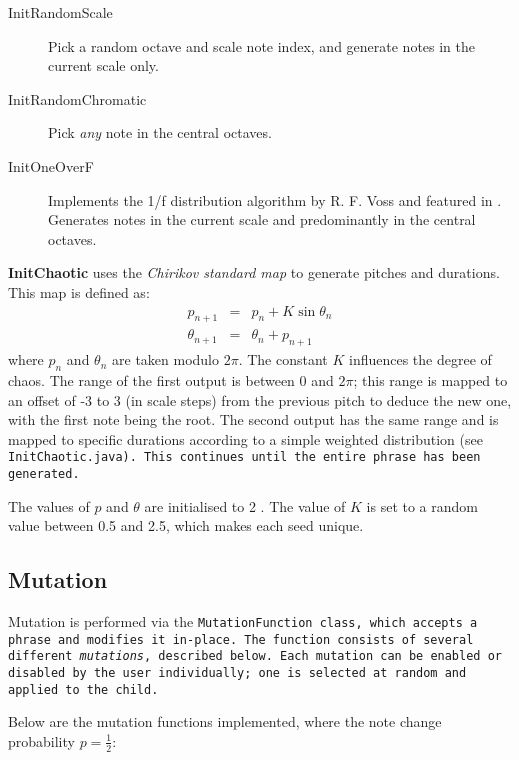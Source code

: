 \begin{description}
\item[InitRandomScale] Pick a random octave and scale note index, and generate notes in the current scale only.
\item[InitRandomChromatic] Pick \emph{any} note in the central octaves.
\item[InitOneOverF] Implements the 1/f distribution algorithm by R. F. Voss and featured in \citep{dodge85}. Generates notes in the current scale and predominantly in the central octaves.
\end{description}

\textbf{InitChaotic} uses the \emph{Chirikov standard map} to generate pitches and durations. This map is defined as: \begin{eqnarray*}p_{n+1} & = & p_n + K \sin \theta_n \\
	\theta_{n+1} & = & \theta_n + p_{n+1}
\end{eqnarray*}
where $p_n$ and $\theta_n$ are taken modulo $2\pi$. The constant $K$ influences the degree of chaos. The range of the first output is between 0 and $2\pi$; this range is mapped to an offset of -3 to 3 (in scale steps) from the previous pitch to deduce the new one, with the first note being the root. The second output has the same range and is mapped to specific durations according to a simple weighted distribution (see \tt{InitChaotic.java}). This continues until the entire phrase has been generated.

The values of $p$ and $\theta$ are initialised to 2 \citep[as in][]{morris05}. The value of $K$ is set to a random value between 0.5 and 2.5, which makes each seed unique.

\subsection{Mutation}

Mutation is performed via the \tt{MutationFunction} class, which accepts a phrase and modifies it in-place. The function consists of several different \emph{mutations}, described below. Each mutation can be enabled or disabled by the user individually; one is selected at random and applied to the child.

Below are the mutation functions implemented, where the note change probability $p = \frac{1}{2}$:

